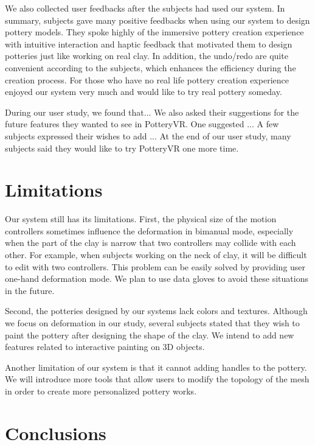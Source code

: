 We also collected user feedbacks after the subjects had used our system. In summary, subjects gave many positive feedbacks when using our system to design pottery models. They spoke highly of the immersive pottery creation experience with intuitive interaction and haptic feedback that motivated them to design potteries just like working on real clay. In addition, the undo/redo are quite convenient according to the subjects, which enhances the efficiency during the creation process. For those who have no real life pottery creation experience enjoyed our system very much and would like to try real pottery someday. 

During our user study, we found that...
We also asked their suggestions for the future features they wanted to see in PotteryVR.
One suggested ...
A few subjects expressed their wishes to add ...
At the end of our user study, many subjects said they would like to try PotteryVR one more time.

\section{Limitations}
\label{sec:7}

Our system still has its limitations. First, the physical size of the motion controllers sometimes influence the deformation in bimanual mode, especially when the part of the clay is narrow that two controllers may collide with each other. For example, when subjects working on the neck of clay, it will be difficult to edit with two controllers. This problem can be easily solved by providing user one-hand deformation mode. We plan to use data gloves to avoid these situations in the future.

Second, the potteries designed by our systems lack colors and textures. Although we focus on deformation in our study, several subjects stated that they wish to paint the pottery after designing the shape of the clay. We intend to add new features related to interactive painting on 3D objects.

Another limitation of our system is that it cannot adding handles to the pottery. We will introduce more tools that allow users to modify the topology of the mesh in order to create more personalized pottery works.


\section{Conclusions}
\label{sec:8}

